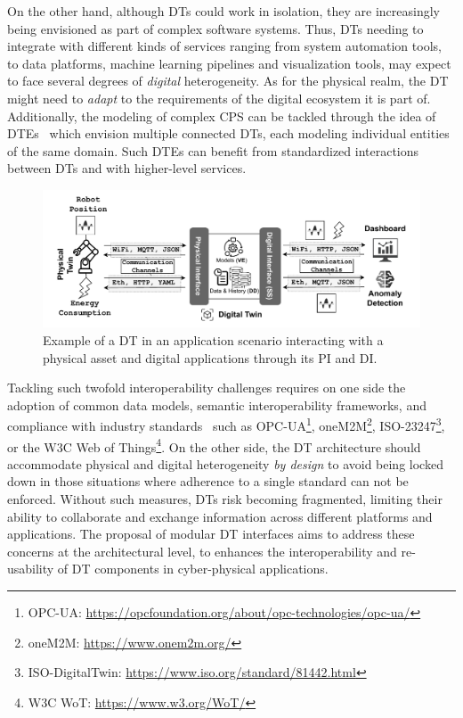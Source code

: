 On the other hand, although \acp{DT} could work in isolation, they are increasingly being envisioned as part of complex software systems.
%
Thus, \acp{DT} needing to integrate with different kinds of services ranging from system automation tools, to data platforms, machine learning pipelines and visualization tools, may expect to face several degrees of \emph{digital} heterogeneity.
%
As for the physical realm, the \ac{DT} might need to \emph{adapt} to the requirements of the digital ecosystem it is part of.
%
Additionally, the modeling of complex \ac{CPS} can be tackled through the idea of \acp{DTE}~\cite{web-of-dt-ricci-2022} which envision multiple connected \acp{DT}, each modeling individual entities of the same domain. 
Such \acp{DTE} can benefit from standardized interactions between \acp{DT} and with higher-level services.

\begin{figure}[t]
    \centering
    \includegraphics[width=\columnwidth]{figures/dt_application_example.pdf}
    \caption{Example of a DT in an application scenario interacting with a physical asset and digital applications through its PI and DI.}
    \label{fig:dt_application_example}
\end{figure}


Tackling such twofold interoperability challenges requires on one side
the adoption of common data models, semantic interoperability frameworks, and compliance with industry standards~\cite{etsi-dt-comm-requirements-2024} such as OPC-UA\footnote{OPC-UA: \url{https://opcfoundation.org/about/opc-technologies/opc-ua/}}, oneM2M\footnote{oneM2M: \url{https://www.onem2m.org/}}, ISO-23247\footnote{ISO-DigitalTwin: \url{https://www.iso.org/standard/81442.html}}, or the W3C Web of Things\footnote{W3C WoT: \url{https://www.w3.org/WoT/}}.
%
On the other side, the \ac{DT} architecture should accommodate physical and digital heterogeneity \emph{by design} to avoid being locked down in those situations where adherence to a single standard can not be enforced.
Without such measures, \acp{DT} risk becoming fragmented, limiting their ability to collaborate and exchange information across different platforms and applications.
%
The proposal of modular \ac{DT} interfaces aims to address these concerns
at the architectural level, to enhances the interoperability and re-usability of \ac{DT} components in cyber-physical applications.

